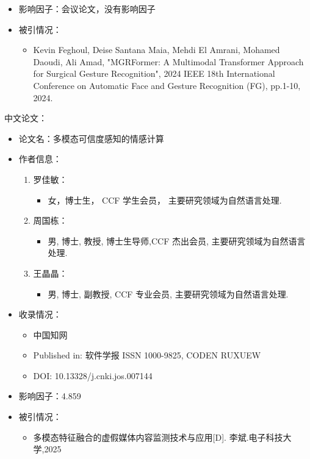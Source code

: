 \begin{itemize}
    \item 影响因子：会议论文，没有影响因子
    \item 被引情况：
        \begin{itemize}
            \item Kevin Feghoul, Deise Santana Maia, Mehdi El Amrani, Mohamed Daoudi, Ali Amad, "MGRFormer: A Multimodal Transformer Approach for Surgical Gesture Recognition", 2024 IEEE 18th International Conference on Automatic Face and Gesture Recognition (FG), pp.1-10, 2024.
        \end{itemize}
\end{itemize}

中文论文：

\begin{itemize}
    \item 论文名：多模态可信度感知的情感计算
    \item 作者信息：
        \begin{enumerate}
            \item 罗佳敏：
                \begin{itemize}
                    \item 女，博士生， CCF 学生会员， 主要研究领域为自然语言处理. 
                \end{itemize}
            \item 周国栋：
                \begin{itemize}
                    \item 男, 博士, 教授, 博士生导师,CCF 杰出会员, 主要研究领域为自然语言处理.
                \end{itemize}

            \item 王晶晶：
                \begin{itemize}
                    \item 男, 博士, 副教授, CCF 专业会员, 主要研究领域为自然语言处理.
                \end{itemize}
        \end{enumerate}

    \item 收录情况：
        \begin{itemize}
            \item 中国知网
            \item Published in: 软件学报 ISSN 1000-9825, CODEN RUXUEW
            \item DOI: 10.13328/j.cnki.jos.007144
        \end{itemize}

    \item 影响因子：4.859
    \item 被引情况：
        \begin{itemize}
            \item  多模态特征融合的虚假媒体内容监测技术与应用[D]. 李斌.电子科技大学,2025
        \end{itemize}
\end{itemize}


